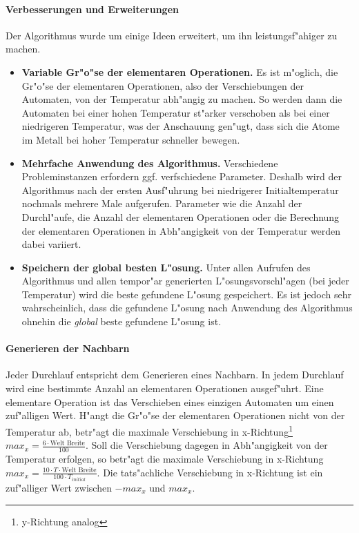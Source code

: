 \paragraph{Verbesserungen und Erweiterungen}
Der Algorithmus wurde um einige Ideen erweitert, um ihn leistungsf"ahiger zu machen.
\begin{itemize}
\item \textbf{Variable Gr"o"se der elementaren Operationen.} Es ist m"oglich, die Gr"o"se der elementaren Operationen, also der Verschiebungen der Automaten, von der Temperatur abh"angig zu machen. So werden dann die Automaten bei einer hohen Temperatur st"arker verschoben als bei einer niedrigeren Temperatur, was der Anschauung gen"ugt, dass sich die Atome im Metall bei hoher Temperatur schneller bewegen. 
\item \textbf{Mehrfache Anwendung des Algorithmus.} Verschiedene Probleminstanzen erfordern ggf. verfschiedene Parameter. Deshalb wird der Algorithmus nach der ersten Ausf"uhrung bei niedrigerer Initialtemperatur nochmals mehrere Male aufgerufen. Parameter wie die Anzahl der Durchl"aufe, die Anzahl der elementaren Operationen oder die Berechnung der elementaren Operationen in Abh"angigkeit von der Temperatur werden dabei variiert.
\item \textbf{Speichern der global besten L"osung.} Unter allen Aufrufen des Algorithmus und allen tempor"ar generierten L"osungsvorschl"agen (bei jeder Temperatur) wird die beste gefundene L"osung gespeichert. Es ist jedoch sehr wahrscheinlich, dass die gefundene L"osung nach Anwendung des Algorithmus ohnehin die \emph{global} beste gefundene L"osung ist.
\end{itemize}

\paragraph{Generieren der Nachbarn}
Jeder Durchlauf entspricht dem Generieren eines Nachbarn. In jedem Durchlauf wird eine bestimmte Anzahl an elementaren Operationen ausgef"uhrt. Eine elementare Operation ist das Verschieben eines einzigen Automaten um einen zuf"alligen Wert. H"angt die Gr"o"se der elementaren Operationen nicht von der Temperatur ab, betr"agt die maximale Verschiebung in x-Richtung\footnote{y-Richtung analog} \(max_{x} = \frac{6 \cdot \mbox{Welt Breite}}{100}\). Soll die Verschiebung dagegen in Abh"angigkeit von der Temperatur erfolgen, so betr"agt die maximale Verschiebung in x-Richtung \(max_{x} = \frac{10 \cdot T \cdot \mbox{Welt Breite}}{100 \cdot {T_{initial}}}\). Die tats"achliche Verschiebung in x-Richtung ist ein zuf"alliger Wert zwischen \(-max_x\) und \(max_x\).

